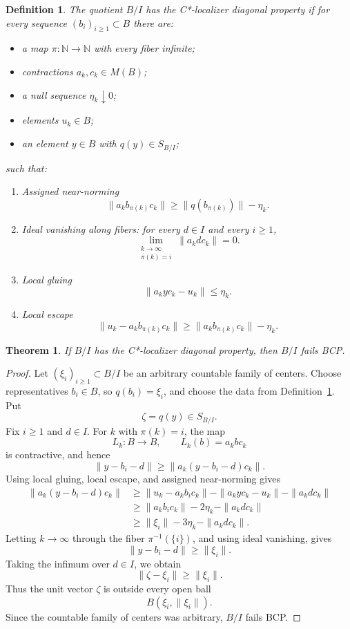\documentclass[11pt]{article}
\newtheorem{theorem}{Theorem}
\newtheorem{definition}{Definition}
\newcommand{\N}{\mathbb N}
\begin{document}
\begin{definition}
\label{def:localizer-property}
The quotient \(B/I\) has the C*-localizer diagonal property if for every
sequence \((b_i)_{i\ge1}\subset B\) there are:
\begin{itemize}
\item a map \(\pi:\N\to\N\) with every fiber infinite;
\item contractions \(a_k,c_k\in M(B)\);
\item a null sequence \(\eta_k\downarrow0\);
\item elements \(u_k\in B\);
\item an element \(y\in B\) with \(q(y)\in S_{B/I}\);
\end{itemize}
such that:
\begin{enumerate}
\item \emph{Assigned near-norming}
\[
        \|a_kb_{\pi(k)}c_k\|
        \ge
        \|q(b_{\pi(k)})\|-\eta_k .
\]
\item \emph{Ideal vanishing along fibers}: for every \(d\in I\) and every
\(i\ge1\),
\[
        \lim_{\substack{k\to\infty\\ \pi(k)=i}}\|a_kdc_k\|=0 .
\]
\item \emph{Local gluing}
\[
        \|a_kyc_k-u_k\|\le \eta_k .
\]
\item \emph{Local escape}
\[
        \|u_k-a_kb_{\pi(k)}c_k\|
        \ge
        \|a_kb_{\pi(k)}c_k\|-\eta_k .
\]
\end{enumerate}
\end{definition}

\begin{theorem}
\label{thm:localizer}
If \(B/I\) has the C*-localizer diagonal property, then \(B/I\) fails BCP.
\end{theorem}

\begin{proof}
Let \((\xi_i)_{i\ge1}\subset B/I\) be an arbitrary countable family of
centers.  Choose representatives \(b_i\in B\), so \(q(b_i)=\xi_i\), and
choose the data from Definition~\ref{def:localizer-property}.  Put
\[
        \zeta=q(y)\in S_{B/I}.
\]
Fix \(i\ge1\) and \(d\in I\).  For \(k\) with \(\pi(k)=i\), the map
\[
        L_k:B\to B,\qquad L_k(b)=a_kbc_k
\]
is contractive, and hence
\[
        \|y-b_i-d\|\ge \|a_k(y-b_i-d)c_k\|.
\]
Using local gluing, local escape, and assigned near-norming gives
\begin{align*}
        \|a_k(y-b_i-d)c_k\|
        &\ge
        \|u_k-a_kb_ic_k\|-\|a_kyc_k-u_k\|-\|a_kdc_k\|\\
        &\ge
        \|a_kb_ic_k\|-2\eta_k-\|a_kdc_k\|\\
        &\ge
        \|\xi_i\|-3\eta_k-\|a_kdc_k\|.
\end{align*}
Letting \(k\to\infty\) through the fiber \(\pi^{-1}(\{i\})\), and using ideal
vanishing, gives
\[
        \|y-b_i-d\|\ge \|\xi_i\|.
\]
Taking the infimum over \(d\in I\), we obtain
\[
        \|\zeta-\xi_i\|\ge \|\xi_i\|.
\]
Thus the unit vector \(\zeta\) is outside every open ball
\[
        B(\xi_i,\|\xi_i\|).
\]
Since the countable family of centers was arbitrary, \(B/I\) fails BCP.
\end{proof}
\end{document}
